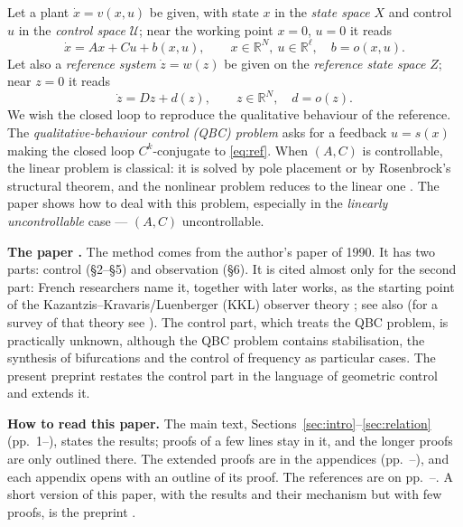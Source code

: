 \documentclass[11pt,reqno]{amsart}
\theoremstyle{plain}
\theoremstyle{definition}
\theoremstyle{remark}
\newcommand{\R}{\mathbb{R}}
\begin{document}
Let a plant $\dot x=v(x,u)$ be given, with state $x$ in the \emph{state space} $X$ and control $u$ in the
\emph{control space} $\mathcal U$; near the working point $x=0$, $u=0$ it reads
\begin{equation}\label{eq:plant}
  \dot x = A x + C u + b(x,u), \qquad x\in\R^{N},\ u\in\R^{\ell},\quad b=o(x,u).
\end{equation}
Let also a \emph{reference system} $\dot z=w(z)$ be given on the \emph{reference state space} $Z$; near $z=0$
it reads
\begin{equation}\label{eq:ref}
  \dot z = D z + d(z), \qquad z\in\R^{N},\quad d=o(z).
\end{equation}
We wish the closed loop to reproduce the qualitative behaviour of the reference. The
\emph{qualitative-behaviour control (QBC) problem} asks for a feedback $u=s(x)$ making the
closed loop $C^{k}$-conjugate to \eqref{eq:ref}. When $(A,C)$ is controllable, the linear problem is classical: it is solved by pole placement or by Rosenbrock's
structural theorem, and the nonlinear problem reduces to the linear one \cite[Thm.~2.5]{Shosh1990}. The paper shows how to deal with this problem, especially in the
\emph{linearly uncontrollable} case --- $(A,C)$ uncontrollable.

\medskip
\noindent\textbf{The paper \cite{Shosh1990}.} The method comes from the author's paper \cite{Shosh1990} of 1990. It has
two parts: control (\S2--\S5) and observation (\S6). It is cited almost only for the second part: French researchers
name it, together with later works, as the starting point of the Kazantzis--Kravaris/Luenberger (KKL) observer
theory \cite{BrivadisAndrieuBernardSerres2023}; see also \cite{Andrieu2014} (for a survey of that theory see \cite{BernardAndrieuAstolfi2022}). The control part, which treats the QBC
problem, is practically unknown, although the QBC problem contains stabilisation, the synthesis of bifurcations and
the control of frequency as particular cases. The present preprint restates the control part in the language of geometric control and
extends it.

\medskip
\noindent\textbf{How to read this paper.} The main text, Sections~\ref{sec:intro}--\ref{sec:relation}
(pp.~1--\pageref{pg:mainend}), states the results; proofs of a few lines stay in it, and the longer proofs are only
outlined there. The extended proofs are in the appendices (pp.~\pageref{app:brockett}--\pageref{pg:append}), and each
appendix opens with an outline of its proof. The references are on pp.~\pageref{pg:refs}--\pageref{pg:last}. A short version of this paper, with the
results and their mechanism but with few proofs, is the preprint \cite{Core}.
\end{document}
